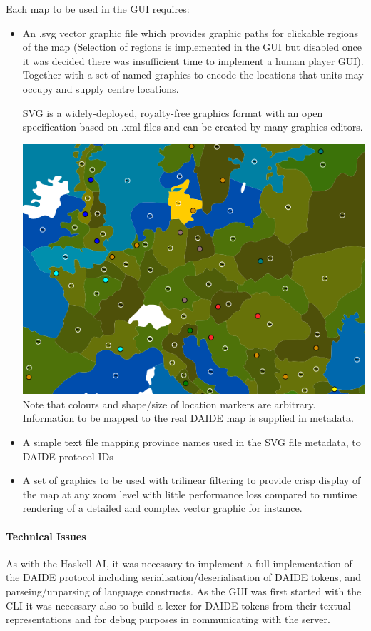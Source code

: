 \documentclass[pdftex,12pt,a4paper]{report}
\begin{document}
Each map to be used in the GUI requires:
\begin{itemize}
\item{An .svg vector graphic file which provides graphic paths for clickable regions of the map (Selection of regions is implemented in the GUI but disabled once it was decided there was insufficient time to implement a human player GUI). Together with a set of named graphics to encode the locations that units may occupy and supply centre locations.

SVG is a widely-deployed, royalty-free graphics format with an open specification based on .xml files and can be created by many graphics editors.

\includegraphics[scale=0.5]{./gui/SVG.png}
Note that colours and shape/size of location markers are arbitrary. Information to be mapped to the real DAIDE map is supplied in metadata.}
\item{A simple text file mapping province names used in the SVG file metadata, to DAIDE protocol IDs}
\item{A set of graphics to be used with trilinear filtering to provide crisp display of the map at any zoom level with little performance loss compared to runtime rendering of a detailed and complex vector graphic for instance.}

\end{itemize}

\paragraph{Technical Issues}
As with the Haskell AI, it was necessary to implement a full implementation of the DAIDE protocol including serialisation/deserialisation of DAIDE tokens, and parseing/unparsing of language constructs. As the GUI was first started with the CLI it was necessary also to build a lexer for DAIDE tokens from their textual representations and for debug purposes in communicating with the server.
\end{document}
